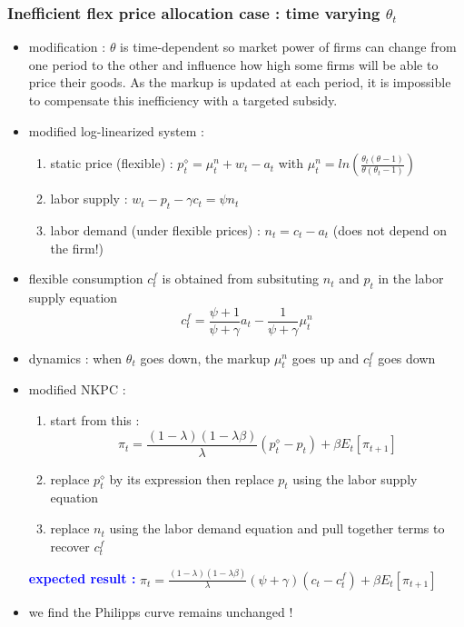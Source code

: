 \documentclass{article}
\begin{document}
\subsubsection{Inefficient flex price allocation case : time varying $\theta_t$}
\begin{itemize}
    \item modification : $\theta$ is time-dependent so market power of firms can change from one period to the other and influence how high some firms will be able to price their goods. As the markup is updated at each period, it is impossible to compensate this inefficiency with a targeted subsidy. 
    \item modified log-linearized system : 
    \begin{enumerate}
        \item static price (flexible) : $p_t^{\diamond} = \mu_t^n+w_t-a_t$ with $\mu_t^n=ln(\frac{\theta_t(\theta-1)}{\theta(\theta_t-1)})$
        \item labor supply : $w_t-p_t-\gamma c_t=\psi n_t$ 
        \item labor demand (under flexible prices) : $n_t = c_t-a_t$ (does not depend on the firm!)
    \end{enumerate}
    \item flexible consumption $c_t^f$ is obtained from subsituting $n_t$ and $p_t$ in the labor supply equation
    \begin{equation}
        c_t^f= \frac{\psi +1}{\psi+\gamma}a_t - \frac{1}{\psi+\gamma}\mu_t^n
    \end{equation}
    \item dynamics : when $\theta_t$ goes down, the markup $\mu_t^n$ goes up and $c_t^f$ goes down 
    \item modified NKPC : 
    \begin{enumerate}
        \item start from this : 
    \begin{equation}
        \pi_t = \frac{(1-\lambda)(1-\lambda\beta)}{\lambda}(p_t^{\diamond}-p_t) + \beta E_t[\pi_{t+1}]
    \end{equation}
        \item replace $p_t^{\diamond}$ by its expression then replace $p_t$ using the labor supply equation
        \item replace $n_t$ using the labor demand equation and pull together terms to recover $c_t^f$
    \end{enumerate}
    \begin{expectedresultsbox}
        \textcolor{blue}{\textbf{expected result : }}$\pi_t = \frac{(1-\lambda)(1-\lambda\beta)}{\lambda}(\psi+\gamma)(c_t-c_t^f) + \beta E_t[\pi_{t+1}]$
    \end{expectedresultsbox}
    \item we find the Philipps curve remains unchanged ! 
\end{itemize}
\end{document}

